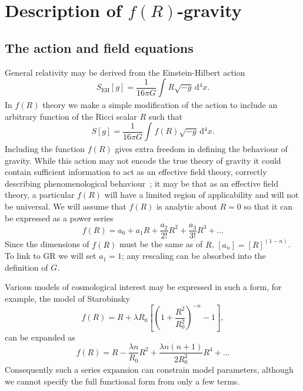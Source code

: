 \documentclass[aps,prd,amsfonts,amssymb,amsmath,nofootinbib,reprint,showpacs]{revtex4-1}
\newcommand{\sub}[1]{\ensuremath{_\text{#1}}}
\newcommand{\dd}{\ensuremath{\text{d}}}
\newcommand{\intd}[4]{\ensuremath{\int_{#1}^{#2}{#3}\,\dd{#4}}}
\newcommand{\recip}[1]{\ensuremath{\frac{1}{#1}}}
\begin{document}
\section{Description of $f(R)$-gravity}

\subsection{The action and field equations\label{sec:Action}}

General relativity may be derived from the Einstein-Hilbert action~\cite{Misner1973, Landau1975}
\begin{equation}
S\sub{EH}[g] = \recip{16\pi G}\intd{}{}{R\sqrt{-g}}{^4x}.
\end{equation}
In $f(R)$ theory we make a simple modification of the action to include an arbitrary function of the Ricci scalar $R$ such that~\cite{Buchdahl1970}
\begin{equation}
S[g] = \recip{16\pi G}\intd{}{}{f(R)\sqrt{-g}}{^4x}.
\end{equation}
Including the function $f(R)$ gives extra freedom in defining the behaviour of gravity. While this action may not encode the true theory of gravity it could contain sufficient information to act as an effective field theory, correctly describing phenomenological behaviour~\cite{Park2010}; it may be that as an effective field theory, a particular $f(R)$ will have a limited region of applicability and will not be universal. We will assume that $f(R)$ is analytic about $R = 0$ so that it can be expressed as a power series~\cite{Buchdahl1970, Capozziello2007, Faulkner2007, Clifton2008, Psaltis2008}
\begin{equation}
f(R) = a_0 + a_1 R + \frac{a_2}{2!}R^2 + \frac{a_3}{3!}R^3 + \ldots
\end{equation}
Since the dimensions of $f(R)$ must be the same as of $R$, $[a_n] = [R]^{(1-n)}$. To link to GR we will set $a_1 = 1$; any rescaling can be absorbed into the definition of $G$.

Various models of cosmological interest may be expressed in such a form, for example, the model of Starobinsky~\cite{Starobinsky2007}
\begin{equation}
f(R) = R + \lambda R_0 \left[\left(1 + \frac{R^2}{R_0^2}\right)^{-n} - 1\right],
\end{equation}
can be expanded as
\begin{equation}
f(R) = R - \frac{\lambda n}{R_0} R^2 + \frac{\lambda n (n + 1)}{2 R_0^3} R^4 + \ldots
\end{equation}
Consequently such a series expansion can constrain model parameters, although we cannot specify the full functional form from only a few terms.
\end{document}
